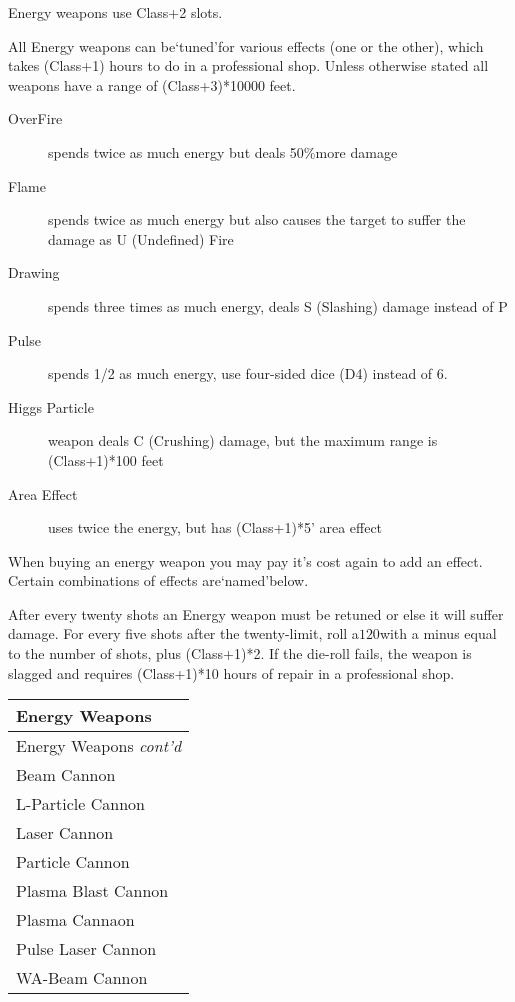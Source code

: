 \documentclass[twoside]{book}
\begin{document}
    {  
    Energy weapons use Class+2 slots.
    }
  
    {  
    All Energy weapons can be`tuned'for various effects (one or the other), which takes (Class+1) hours to do in a professional shop. Unless otherwise stated all weapons have a range of (Class+3)*10000 feet.
    }
  
\begin{description}
    
  \item[OverFire] 
    {  
    spends twice as much energy but deals 50\%more damage
    }
  
  \item[Flame] 
    {  
    spends twice as much energy but also causes the target to suffer the damage as U (Undefined) Fire
    }
  
  \item[Drawing] 
    {  
    spends three times as much energy, deals S (Slashing) damage instead of P
    }
  
  \item[Pulse] 
    {  
    spends 1/2 as much energy, use four-sided dice (D4) instead of 6.
    }
  
  \item[Higgs Particle] 
    {  
    weapon deals C (Crushing) damage, but the maximum range is (Class+1)*100 feet
    }
  
  \item[Area Effect] 
    {  
    uses twice the energy, but has (Class+1)*5' area effect
    }
  
\end{description}
  
    {  
    When buying an energy weapon you may pay it's cost again to add an effect. Certain combinations of effects are`named'below.
    }
  
    {  
    After every twenty shots an Energy weapon must be retuned or else it will suffer damage. For every five shots after the twenty-limit, roll a\ensuremath{1}\ensuremath{20}\ensuremath{}with a minus equal to the number of shots, plus (Class+1)*2. If the die-roll fails, the weapon is slagged and requires (Class+1)*10 hours of repair in a professional shop.
    }
  
\begin{longtable}{p{1.25in}} 
  Energy Weapons\\
  \hline
  \hline
  \endfirsthead
  Energy Weapons \textit{cont'd}
         \\
  \hline
  \endhead
\raggedright Beam Cannon\tabularnewline
      \raggedright L-Particle Cannon\tabularnewline
      \raggedright Laser Cannon\tabularnewline
      \raggedright Particle Cannon\tabularnewline
      \raggedright Plasma Blast Cannon\tabularnewline
      \raggedright Plasma Cannaon\tabularnewline
      \raggedright Pulse Laser Cannon\tabularnewline
      \raggedright WA-Beam Cannon\tabularnewline
      
\end{longtable}
    
\end{document}
